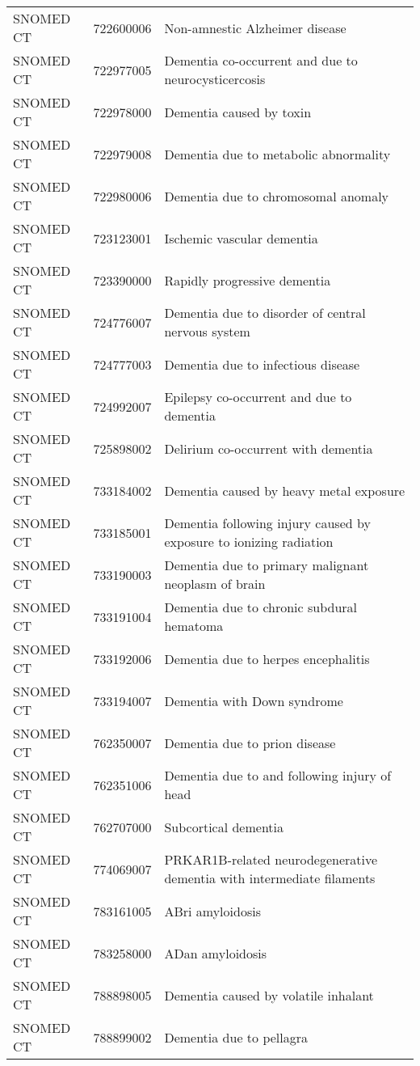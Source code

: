 \begin{longtable}{p{}p{}p{}}
  SNOMED CT & 722600006 & Non-amnestic Alzheimer disease \\ 
  SNOMED CT & 722977005 & Dementia co-occurrent and due to neurocysticercosis \\ 
  SNOMED CT & 722978000 & Dementia caused by toxin \\ 
  SNOMED CT & 722979008 & Dementia due to metabolic abnormality \\ 
  SNOMED CT & 722980006 & Dementia due to chromosomal anomaly \\ 
  SNOMED CT & 723123001 & Ischemic vascular dementia \\ 
  SNOMED CT & 723390000 & Rapidly progressive dementia \\ 
  SNOMED CT & 724776007 & Dementia due to disorder of central nervous system \\ 
  SNOMED CT & 724777003 & Dementia due to infectious disease \\ 
  SNOMED CT & 724992007 & Epilepsy co-occurrent and due to dementia \\ 
  SNOMED CT & 725898002 & Delirium co-occurrent with dementia \\ 
  SNOMED CT & 733184002 & Dementia caused by heavy metal exposure \\ 
  SNOMED CT & 733185001 & Dementia following injury caused by exposure to ionizing radiation \\ 
  SNOMED CT & 733190003 & Dementia due to primary malignant neoplasm of brain \\ 
  SNOMED CT & 733191004 & Dementia due to chronic subdural hematoma \\ 
  SNOMED CT & 733192006 & Dementia due to herpes encephalitis \\ 
  SNOMED CT & 733194007 & Dementia with Down syndrome \\ 
  SNOMED CT & 762350007 & Dementia due to prion disease \\ 
  SNOMED CT & 762351006 & Dementia due to and following injury of head \\ 
  SNOMED CT & 762707000 & Subcortical dementia \\ 
  SNOMED CT & 774069007 & PRKAR1B-related neurodegenerative dementia with intermediate filaments \\ 
  SNOMED CT & 783161005 & ABri amyloidosis \\ 
  SNOMED CT & 783258000 & ADan amyloidosis \\ 
  SNOMED CT & 788898005 & Dementia caused by volatile inhalant \\ 
  SNOMED CT & 788899002 & Dementia due to pellagra \\ 

\end{longtable}
